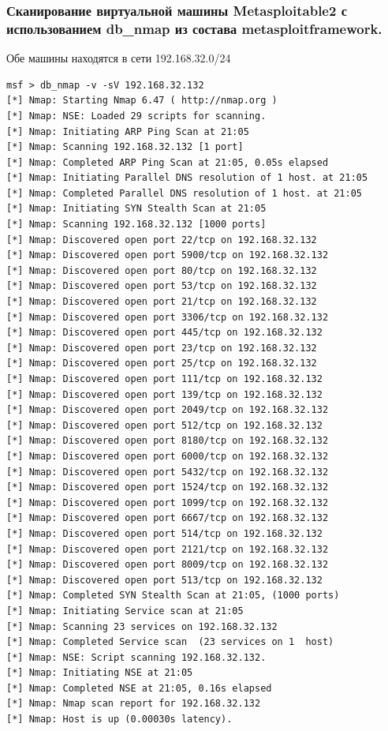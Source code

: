 \documentclass[a4paper, 14pt]{article}				%
\begin{document}
\subsubsection{Сканирование виртуальной машины Metasploitable2 с использованием db\_nmap из состава metasploitframework.}
Обе машины находятся в сети 192.168.32.0/24
\begin{Verbatim}[frame=single]
msf > db_nmap -v -sV 192.168.32.132
[*] Nmap: Starting Nmap 6.47 ( http://nmap.org )
[*] Nmap: NSE: Loaded 29 scripts for scanning.
[*] Nmap: Initiating ARP Ping Scan at 21:05
[*] Nmap: Scanning 192.168.32.132 [1 port]
[*] Nmap: Completed ARP Ping Scan at 21:05, 0.05s elapsed
[*] Nmap: Initiating Parallel DNS resolution of 1 host. at 21:05
[*] Nmap: Completed Parallel DNS resolution of 1 host. at 21:05
[*] Nmap: Initiating SYN Stealth Scan at 21:05
[*] Nmap: Scanning 192.168.32.132 [1000 ports]
[*] Nmap: Discovered open port 22/tcp on 192.168.32.132
[*] Nmap: Discovered open port 5900/tcp on 192.168.32.132
[*] Nmap: Discovered open port 80/tcp on 192.168.32.132
[*] Nmap: Discovered open port 53/tcp on 192.168.32.132
[*] Nmap: Discovered open port 21/tcp on 192.168.32.132
[*] Nmap: Discovered open port 3306/tcp on 192.168.32.132
[*] Nmap: Discovered open port 445/tcp on 192.168.32.132
[*] Nmap: Discovered open port 23/tcp on 192.168.32.132
[*] Nmap: Discovered open port 25/tcp on 192.168.32.132
[*] Nmap: Discovered open port 111/tcp on 192.168.32.132
[*] Nmap: Discovered open port 139/tcp on 192.168.32.132
[*] Nmap: Discovered open port 2049/tcp on 192.168.32.132
[*] Nmap: Discovered open port 512/tcp on 192.168.32.132
[*] Nmap: Discovered open port 8180/tcp on 192.168.32.132
[*] Nmap: Discovered open port 6000/tcp on 192.168.32.132
[*] Nmap: Discovered open port 5432/tcp on 192.168.32.132
[*] Nmap: Discovered open port 1524/tcp on 192.168.32.132
[*] Nmap: Discovered open port 1099/tcp on 192.168.32.132
[*] Nmap: Discovered open port 6667/tcp on 192.168.32.132
[*] Nmap: Discovered open port 514/tcp on 192.168.32.132
[*] Nmap: Discovered open port 2121/tcp on 192.168.32.132
[*] Nmap: Discovered open port 8009/tcp on 192.168.32.132
[*] Nmap: Discovered open port 513/tcp on 192.168.32.132
[*] Nmap: Completed SYN Stealth Scan at 21:05, (1000 ports)
[*] Nmap: Initiating Service scan at 21:05
[*] Nmap: Scanning 23 services on 192.168.32.132
[*] Nmap: Completed Service scan  (23 services on 1  host)
[*] Nmap: NSE: Script scanning 192.168.32.132.
[*] Nmap: Initiating NSE at 21:05
[*] Nmap: Completed NSE at 21:05, 0.16s elapsed
[*] Nmap: Nmap scan report for 192.168.32.132
[*] Nmap: Host is up (0.00030s latency).

\end{Verbatim}
\end{document}
